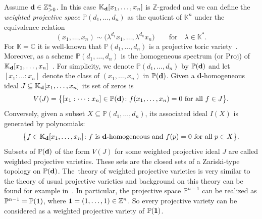 \documentclass[10pt,a4paper]{amsart}
\numberwithin{equation}{section}
\begin{document}
Assume ${\bf d}\in \mathbb Z^n_{> 0}$. In this case $\mathbb K_{\bf d}[x_1, \dots , x_n]$ is $\mathbb Z$-graded and we can define the {\it weighted projective space} $\mathbb P (d_1, \dots , d_n)$ as the quotient of $\mathbb K^n$ under the equivalence relation
\begin{displaymath}
(x_1,\dots , x_n) \sim \big(\lambda^{d_1}x_1, \dots ,\lambda^{d_n} x_n\big) \qquad\text{for}\quad\lambda \in \mathbb K^{\ast}.
\end{displaymath}
For $\mathbb K = \mathbb C$ it is well-known that $\mathbb P (d_1, \dots , d_n)$ is a projective toric variety~\cite{CLS}.
Moreover, as a scheme $\mathbb P(d_1,\dots,d_n)$ is the homogeneous spectrum (or Proj) of $\mathbb K_{\bf d}[x_1,\dots,x_n]$~\cite[Notation~1.1]{Dolgachev}.
For simplicity, we denote $\mathbb P (d_1, \dots , d_n)$ by $\mathbb P ({\bf d})$ and let $[x_1:\dots : x_n]$ denote the class of $(x_1, \dots , x_n)$ in $\mathbb P ({\bf d})$.
Given a {\bf d}-homogeneous ideal $J \subseteq \mathbb K_{\bf d}[x_1, \dots , x_n]$ its set of zeros is
\begin{displaymath}
V(J)=\big\{ [x_1:\dots : x_n]\in \mathbb P ({\bf d}) \colon f(x_1,\dots , x_n)=0\text{ for all }f\in J\big\}.
\end{displaymath}
Conversely, given a subset $X \subseteq \mathbb P (d_1,\dots,d_n)$, its associated ideal $I(X)$ is generated by polynomials:
\begin{displaymath}
\big\{ f \in \mathbb K_{\bf d}[x_1,\dots , x_n] \colon f \text{ is }{\bf d}\text{-homogeneous and }f(p)=0\text{ for all }p\in X \big\}.
\end{displaymath}
Subsets of $\mathbb P({\bf d})$ of the form $V(J)$ for some weighted projective ideal $J$ are called weighted projective varieties.
These sets are the closed sets of a Zariski-type topology on $ \mathbb P({\bf d})$.
The~the\-ory of weighted projective varieties is very similar to the theory of usual projective varieties and background on this theory can be found for example in~\cite{Dolgachev,Hosgood,Reid}. In particular, the projective space $\mathbb{P}^{n-1}$ can be realized as $\mathbb{P}
^{n-1}=\mathbb P ({\bf 1})$, where ${\bf 1}=(1, \dots , 1)\in \mathbb Z^n$. So every projective variety can be considered as a weighted projective variety of $\mathbb P ({\bf 1})$.
\end{document}
